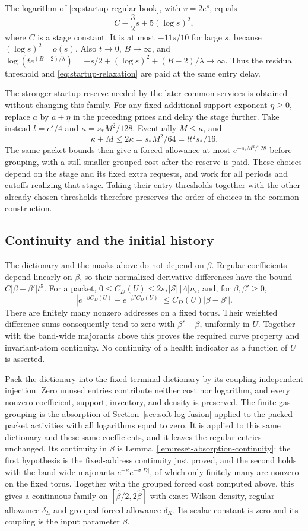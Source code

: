The logarithm of \eqref{eq:startup-regular-book}, with
$v=2e^s$, equals
\[ C-\frac32s+5(\log s)^2, \]
where $C$ is a stage constant.
It is at most $-11s/10$ for large $s$, because
$(\log s)^2=o(s)$. Also $t\to0$, $B\to\infty$, and
$\log(t e^{(B-2)/\lambda})=-s/2+(\log s)^2+
(B-2)/\lambda\to\infty$. Thus the residual threshold and
\eqref{eq:startup-relaxation} are paid at the same entry delay.

The stronger startup reserve needed by the later common services
is obtained without changing this family. For any fixed additional
support exponent $\eta\ge0$, replace $a$ by $a+\eta$ in the
preceding prices and delay the stage further. Take instead
$l=e^s/4$ and $\kappa=s_*M^2/128$. Eventually $M\le\kappa$,
and
\[
       \kappa+M\le2\kappa=s_*M^2/64=lt^2s_*/16.
\]
The same packet bounds then give a forced allowance at most
$e^{-s_*M^2/128}$ before grouping, with a still smaller
grouped cost after the reserve is paid. These choices depend on
the stage and its fixed extra requests, and work for all periods
and cutoffs realizing that stage. Taking their entry thresholds
together with the other already chosen thresholds therefore
preserves the order of choices in the common construction.

\subsection{Continuity and the initial history}
The dictionary and the masks above do not depend on $\beta$.
Regular coefficients depend linearly on $\beta$, so their
normalized derivative differences have the bound
$C|\beta-\beta'|t^5$. For a packet, $0\le C_D(U)\le
2s_*|\mathcal S|\,|\Lambda|n_\square$, and, for
$\beta,\beta'\ge0$,
\[
 |e^{-\beta C_D(U)}-e^{-\beta'C_D(U)}|
                         \le C_D(U)|\beta-\beta'|.
\]
There are finitely many nonzero addresses on a fixed torus.
Their weighted difference sums consequently tend to zero with
$\beta'-\beta$, uniformly in $U$. Together with the band-wide
majorants above this proves the required curve property and
invariant-atom continuity. No continuity of a health indicator
as a function of $U$ is asserted.

Pack the dictionary into the fixed terminal dictionary by its
coupling-independent injection. Zero unused entries contribute
neither cost nor logarithm, and every nonzero coefficient, support,
inventory, and density is preserved. The finite gas grouping is the
absorption of Section~\ref{sec:soft-log-fusion} applied to the packed
packet activities with all logarithms equal to zero. It is applied to
this same dictionary and these same coefficients, and it leaves the
regular entries unchanged. Its continuity in $\beta$ is
Lemma~\ref{lem:reset-absorption-continuity}: the first hypothesis is
the fixed-address continuity just proved, and the second holds with
the band-wide majorants $e^{-\kappa}e^{-\sigma|D|}$, of which only
finitely many are nonzero on the fixed torus. Together with the
grouped forced cost computed above, this gives a continuous family
on $[\widehat\beta/2,2\widehat\beta]$ with exact Wilson density,
regular allowance $\delta_E$ and grouped forced allowance
$\delta_K$. Its scalar constant is zero and its coupling is
the input parameter $\beta$.

